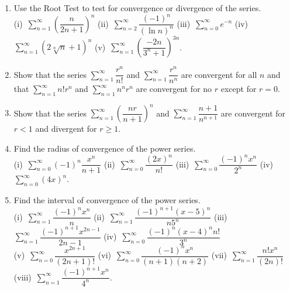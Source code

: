 \documentclass[titlepage,a4paper,12pt]{report}
\begin{document}
\begin{enumerate}
\item Use the Root Test to test for convergence or divergence of the series.\\
(i)\,  $\displaystyle \sum _{n=1}^\infty \left(\dfrac{n}{2n+1}\right)^n$ \quad (ii)\,  $\displaystyle \sum _{n=2}^\infty \dfrac{(-1)^n}{(\ln n)^n}$ \quad (iii)\,  $\displaystyle \sum _{n=0}^\infty e^{-n}$ \quad (iv)\,  $\displaystyle \sum _{n=1}^\infty  (2\sqrt[n]{n}+1)^n$ \quad (v)\,  $\displaystyle \sum _{n=1}^\infty \left( \dfrac{-2n}{3^n+1}\right)^{3n}$.
\item Show that the series $\displaystyle \sum _{n=1}^\infty \dfrac{r^n}{n!}$ and $\displaystyle \sum _{n=1}^\infty \dfrac{r^n}{n^n}$ are convergent for all $n$ and that $\displaystyle \sum _{n=1}^\infty n!r^n$ and $\displaystyle \sum _{n=1}^\infty n^n r^n$ are convergent for no $r$ except for $r=0$.
\item Show that the series $\displaystyle \sum _{n=1}^\infty \left(\dfrac{nr}{n+1}\right)^n$ and $\displaystyle \sum _{n=1}^\infty \dfrac{n+1}{n^{n+1}}$ are convergent for $r<1$ and divergent for $r\geq 1$.
\item Find the radius of convergence of the power series.\\
(i)\, $\displaystyle \sum _{n=0}^\infty (-1)^n \dfrac{x^n}{n+1} $ \quad (ii)\, $\displaystyle \sum _{n=0}^\infty \dfrac{(2x)^n}{n!} $ \quad (iii)\, $\displaystyle \sum _{n=0}^\infty  \dfrac{(-1)^n x^n}{2^n} $ \quad (iv)\,  $\displaystyle \sum _{n=0}^\infty (4x)^n $.
\item Find the interval of convergence of the power series.\\
(i)\, $\displaystyle \sum _{n=1}^\infty \dfrac{(-1)^nx^n}{n} $ \quad (ii)\, $\displaystyle \sum _{n=1}^\infty \dfrac{(-1)^{n+1}(x-5)^n}{n5^n} $ \quad (iii)\, $\displaystyle \sum _{n=1}^\infty \dfrac{(-1)^{n+1}x^{2n-1}}{2n-1} $ \quad (iv)\, $\displaystyle \sum _{n=0}^\infty \dfrac{(-1)^n(x-4)^nn!}{3^n} $\\
(v)\, $\displaystyle \sum _{n=0}^\infty \dfrac{x^{2n+1}}{(2n+1)!} $ \quad (vi)\, $\displaystyle \sum _{n=0}^\infty \dfrac{(-1)^nx^n}{(n+1)(n+2)} $ \quad (vii)\, $\displaystyle \sum _{n=1}^\infty \dfrac{n!x^n}{(2n)!} $ \quad (viii)\, $\displaystyle \sum _{n=1}^\infty \dfrac{(-1)^{n+1}x^n}{4^n} $.
\end{enumerate}
\end{document}
